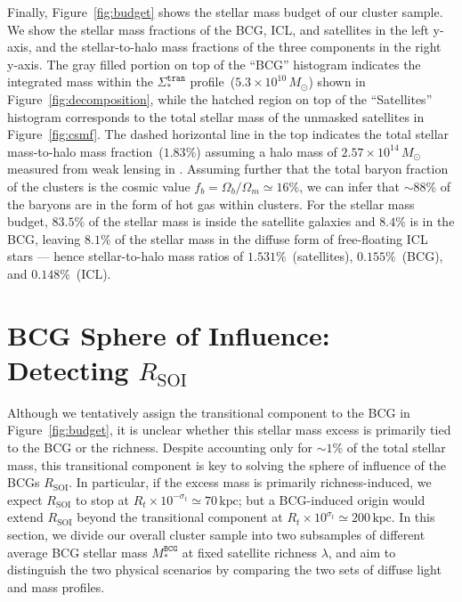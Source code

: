 \documentclass[fleqn,usenatbib]{mnras}
\newcommand{\rsoi}{R_{\mathrm{SOI}}}
\newcommand{\sigtr}{\Sigma_*^{\texttt{tran}}}
\newcommand{\msbcg}{M_*^{\texttt{BCG}}}
\newcommand{\kpc}{\mathrm{kpc}}
\newcommand{\msol}{M_{\odot}}
\begin{document}
Finally, Figure~\ref{fig:budget} shows the stellar mass budget of our
cluster sample. We show the stellar mass fractions of the BCG, ICL, and
satellites in the left y-axis, and the stellar-to-halo mass fractions of the
three components in the right y-axis.  The gray filled portion on top of
the ``BCG'' histogram indicates
the integrated mass within the $\sigtr$ profile~($5.3{\times}10^{10}\,\msol$)
shown in Figure~\ref{fig:decomposition}, while the hatched region
on top of the ``Satellites'' histogram
corresponds to the total stellar mass of the unmasked satellites in Figure~\ref{fig:csmf}. The dashed
horizontal line in the top indicates the total stellar mass-to-halo mass
fraction~($1.83\%$) assuming a halo mass of $2.57{\times}10^{14}\,\msol$
measured from weak lensing in . Assuming further that
the total baryon fraction of the clusters is the cosmic value
$f_{b}{=}\Omega_{b}/\Omega_{m}{\simeq}16\%$, we can infer that
${\sim}88\%$ of the baryons are in the form of hot gas within clusters.
For the stellar mass budget, $83.5\%$ of the stellar mass is inside the
satellite galaxies and $8.4\%$ is in the BCG, leaving $8.1\%$ of the
stellar mass in the diffuse form of free-floating ICL stars --- hence
stellar-to-halo mass ratios of $1.531\%$~(satellites), $0.155\%$~(BCG), and
$0.148\%$~(ICL).




\section{BCG Sphere of Influence: Detecting \texorpdfstring{$\rsoi$}{Rsoi}}
\label{sec:soi}

Although we tentatively assign the transitional component to the BCG in
Figure~\ref{fig:budget}, it is unclear whether this stellar mass excess is
primarily tied to the BCG or the richness. Despite accounting
only for ${\sim}1\%$ of the total stellar mass, this transitional component is
key to solving the sphere of influence of the BCGs $\rsoi$. In particular,
if the excess mass is primarily richness-induced, we expect $\rsoi$ to stop
at $R_t{\times}10^{-\sigma_t}{\simeq}70\,\kpc$; but a BCG-induced origin
would extend $\rsoi$ beyond the transitional component at
$R_t{\times}10^{\sigma_t}{\simeq}200\,\kpc$. In this section, we divide our
overall cluster sample into two subsamples of different average BCG stellar
mass $\msbcg$ at fixed satellite richness $\lambda$, and aim to distinguish
the two physical scenarios by comparing the two sets of diffuse light and
mass profiles.
\end{document}
